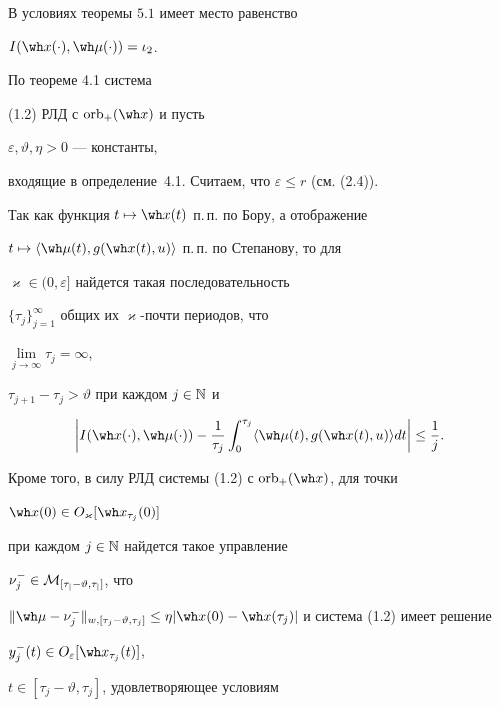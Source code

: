 \begin{thms}


В условиях теоремы $5.1$ имеет место равенство


$I(\wh x(\cdot),\wh\mu(\cdot))=\iota_2$.


\end{thms}





\begin{pf}


По теореме 4.1 система


(1.2) РЛД с $\orb_+(\wh x)$ и пусть


$\varepsilon,\vartheta, \eta>0$ --- константы,


входящие в определение~4.1. Считаем, что $\varepsilon\le r$ (см. (2.4)). 


Так как функция $t\mapsto\wh x(t)$ п.\,п. по Бору, а отображение


$t\mapsto\langle\wh\mu(t),g(\wh x(t),u)\rangle$ п.\,п. по Степанову, то для


$\varkappa\in(0,\varepsilon]$ найдется такая последовательность


$\{\tau_j\}_{j=1}^\infty$ общих их $\varkappa$-почти периодов, что


$\lim\limits_{j\to\infty}\tau_j=\infty$,


$\tau_{j+1}-\tau_j>\vartheta$ при каждом $j\in\Bbb N$ и


\begin{equation}


\bigg|I(\wh x(\cdot),\wh\mu(\cdot))-\frac{1}{\tau_j}\int_0^{\tau_j}


\langle\wh\mu(t),g(\wh x(t),u)\rangle dt\bigg|\le\frac{1}{j}.


\end{equation}


Кроме того, в силу РЛД системы (1.2) с $\orb_+(\wh x)$, для точки


$\wh x(0)\in O_{\varkappa}[\wh x_{\tau_j}(0)]$


при каждом $j\in\Bbb N$ найдется такое управление


$\nu_j^-\in\cal M_{[\tau_j-\vartheta,\tau_j]}$, что


$\|\wh\mu-\nu_j^-\|_{w,[\tau_j-\vartheta,\tau_j]}


\le\eta|\wh x(0)-\wh x(\tau_j)|$ и система (1.2) имеет решение


$y_j^-(t)\in O_\varepsilon[\wh x_{\tau_j}(t)]$,


$t\in[\tau_j-\vartheta,\tau_j]$, удовлетворяющее условиям



\end{pf}

